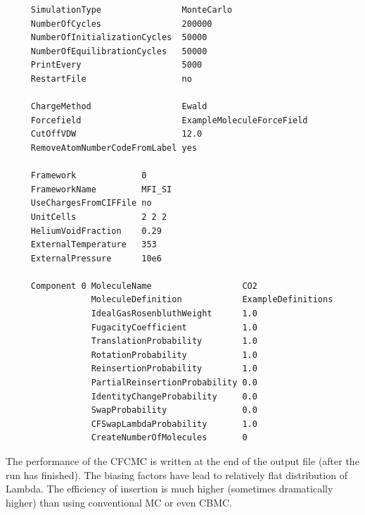 \begin{tiny}
\begin{verbatim}
     SimulationType                MonteCarlo
     NumberOfCycles                200000
     NumberOfInitializationCycles  50000
     NumberOfEquilibrationCycles   50000
     PrintEvery                    5000
     RestartFile                   no
     
     ChargeMethod                  Ewald
     Forcefield                    ExampleMoleculeForceField
     CutOffVDW                     12.0
     RemoveAtomNumberCodeFromLabel yes
     
     Framework             0
     FrameworkName         MFI_SI
     UseChargesFromCIFFile no
     UnitCells             2 2 2
     HeliumVoidFraction    0.29
     ExternalTemperature   353
     ExternalPressure      10e6
     
     Component 0 MoleculeName                  CO2
                 MoleculeDefinition            ExampleDefinitions
                 IdealGasRosenbluthWeight      1.0
                 FugacityCoefficient           1.0
                 TranslationProbability        1.0
                 RotationProbability           1.0
                 ReinsertionProbability        1.0
                 PartialReinsertionProbability 0.0
                 IdentityChangeProbability     0.0
                 SwapProbability               0.0
                 CFSwapLambdaProbability       1.0
                 CreateNumberOfMolecules       0
\end{verbatim}
\end{tiny}

The performance of the CFCMC is written at the end of the output file (after the run has finished).
The biasing factors have lead to relatively flat distribution of Lambda. The efficiency of insertion is
much higher (sometimes dramatically higher) than using conventional MC or even CBMC.

